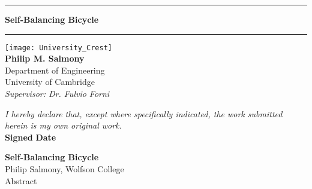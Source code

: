 \begin{titlepage}
	\begin{center}
		\hrule
		\vspace{0.5cm}
		\Huge{\textbf{Self-Balancing Bicycle}} \\
		\vspace{0.5cm}
		\hrule
		\vspace{4cm}
		\texttt{[image: University\_Crest]} \\
		\vspace{3cm}
		\large{\textbf{Philip M. Salmony} \\
		Department of Engineering \\
		University of Cambridge} \\
		\vspace{1.5cm}
		\textit{Supervisor: Dr. Fulvio Forni}
	\end{center}

\vfill

\textit{I hereby declare that, except where specifically indicated, the work submitted herein is my own original work.} \\

\textbf{Signed} \hspace{0.5\textwidth} \textbf{Date}


\end{titlepage}

\newpage
{}

\begin{center}
	\Large{\textbf{Self-Balancing Bicycle}} \\
	\large{Philip Salmony, Wolfson College} \\
	\large{Abstract}
\end{center}

\newpage
{}
\setcounter{page}{1}
\tableofcontents

\newpage
\pagestyle{headings}